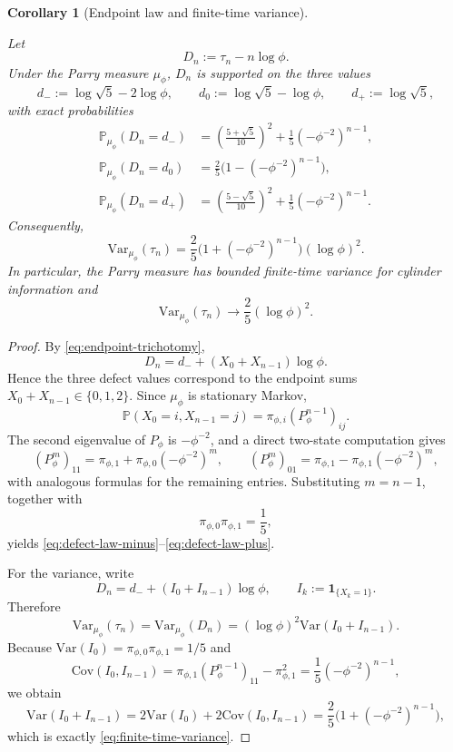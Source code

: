 \documentclass[pdflatex,sn-basic,Numbered]{sn-jnl}
\theoremstyle{thmstyleone}
\newtheorem{corollary}[theorem]{Corollary}
\theoremstyle{thmstyletwo}
\theoremstyle{thmstylethree}
\newcommand{\Var}{\mathrm{Var}}
\newcommand{\PP}{\mathbb{P}}
\newcommand{\leanverified}[1]{}
\begin{document}
\begin{corollary}[Endpoint law and finite-time variance]\label{cor:finite-time-law}
\leanverified{paper_zero_jitter_finite_time_law}
Let
\[
D_n:=\tau_n-n\log\phi.
\]
Under the Parry measure $\mu_\phi$, $D_n$ is supported on the three values
\[
d_-:=\log\sqrt{5}-2\log\phi,\qquad
d_0:=\log\sqrt{5}-\log\phi,\qquad
d_+:=\log\sqrt{5},
\]
with exact probabilities
\begin{align}
\PP_{\mu_\phi}(D_n=d_-)&=\left(\frac{5+\sqrt{5}}{10}\right)^2+\frac{1}{5}(-\phi^{-2})^{n-1}, \label{eq:defect-law-minus}\\
\PP_{\mu_\phi}(D_n=d_0)&=\frac{2}{5}\bigl(1-(-\phi^{-2})^{n-1}\bigr), \label{eq:defect-law-zero}\\
\PP_{\mu_\phi}(D_n=d_+)&=\left(\frac{5-\sqrt{5}}{10}\right)^2+\frac{1}{5}(-\phi^{-2})^{n-1}. \label{eq:defect-law-plus}
\end{align}
Consequently,
\begin{equation}\label{eq:finite-time-variance}
\Var_{\mu_\phi}(\tau_n)
=
\frac{2}{5}\bigl(1+(-\phi^{-2})^{n-1}\bigr)(\log\phi)^2.
\end{equation}
In particular, the Parry measure has bounded finite-time variance for cylinder information and
\[
\Var_{\mu_\phi}(\tau_n)\longrightarrow \frac{2}{5}(\log\phi)^2.
\]
\end{corollary}

\begin{proof}
By \eqref{eq:endpoint-trichotomy},
\[
D_n=d_-+(X_0+X_{n-1})\log\phi.
\]
Hence the three defect values correspond to the endpoint sums $X_0+X_{n-1}\in\{0,1,2\}$. Since $\mu_\phi$ is stationary Markov,
\[
\PP(X_0=i,X_{n-1}=j)=\pi_{\phi,i}(P_\phi^{n-1})_{ij}.
\]
The second eigenvalue of $P_\phi$ is $-\phi^{-2}$, and a direct two-state computation gives
\[
(P_\phi^m)_{11}=\pi_{\phi,1}+\pi_{\phi,0}(-\phi^{-2})^m,
\qquad
(P_\phi^m)_{01}=\pi_{\phi,1}-\pi_{\phi,1}(-\phi^{-2})^m,
\]
with analogous formulas for the remaining entries. Substituting $m=n-1$, together with
\[
\pi_{\phi,0}\pi_{\phi,1}=\frac{1}{5},
\]
yields \eqref{eq:defect-law-minus}--\eqref{eq:defect-law-plus}.

For the variance, write
\[
D_n=d_-+(I_0+I_{n-1})\log\phi,
\qquad
I_k:=\mathbf{1}_{\{X_k=1\}}.
\]
Therefore
\[
\Var_{\mu_\phi}(\tau_n)=\Var_{\mu_\phi}(D_n)
=(\log\phi)^2\Var(I_0+I_{n-1}).
\]
Because $\Var(I_0)=\pi_{\phi,0}\pi_{\phi,1}=1/5$ and
\[
\mathrm{Cov}(I_0,I_{n-1})
=
\pi_{\phi,1}(P_\phi^{n-1})_{11}-\pi_{\phi,1}^2
=
\frac{1}{5}(-\phi^{-2})^{n-1},
\]
we obtain
\[
\Var(I_0+I_{n-1})
=
2\Var(I_0)+2\mathrm{Cov}(I_0,I_{n-1})
=
\frac{2}{5}\bigl(1+(-\phi^{-2})^{n-1}\bigr),
\]
which is exactly \eqref{eq:finite-time-variance}.
\end{proof}
\end{document}
